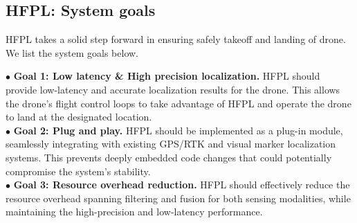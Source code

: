 



\vspace{-0.3cm}
\subsection{HFPL: System goals}
HFPL takes a solid step forward in ensuring safely takeoff and landing of drone. 
We list the system goals below.

\noindent $\bullet$ \textbf{Goal 1: Low latency \& High precision localization.}
HFPL should provide low-latency and accurate localization results for the drone. This allows the drone's flight control loops to take advantage of HFPL and operate the drone to land at the designated location.\\
\noindent $\bullet$ \textbf{Goal 2: Plug and play.}
HFPL should be implemented as a plug-in module, seamlessly integrating with existing GPS/RTK and visual marker localization systems. This prevents deeply embedded code changes that could potentially compromise the system’s stability. \\
\noindent $\bullet$ \textbf{Goal 3: Resource overhead reduction.}
HFPL should effectively reduce the resource overhead spanning filtering and fusion for both sensing modalities, while maintaining the high-precision and low-latency performance.